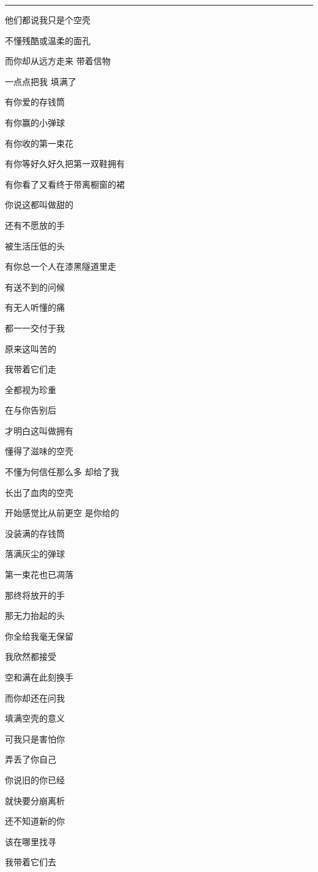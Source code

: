\documentclass[]{ctexbook}
\begin{document}
\begin{center}\rule{0.5\linewidth}{0.5pt}\end{center}

他们都说我只是个空壳

不懂残酷或温柔的面孔

而你却从远方走来 带着信物

一点点把我 填满了

有你爱的存钱筒

有你赢的小弹球

有你收的第一束花

有你等好久好久把第一双鞋拥有

有你看了又看终于带离橱窗的裙

你说这都叫做甜的

还有不愿放的手

被生活压低的头

有你总一个人在漆黑隧道里走

有送不到的问候

有无人听懂的痛

都一一交付于我

原来这叫苦的

我带着它们走

全都视为珍重

在与你告别后

才明白这叫做拥有

懂得了滋味的空壳

不懂为何信任那么多 却给了我

长出了血肉的空壳

开始感觉比从前更空 是你给的

没装满的存钱筒

落满灰尘的弹球

第一束花也已凋落

那终将放开的手

那无力抬起的头

你全给我毫无保留

我欣然都接受

空和满在此刻换手

而你却还在问我

填满空壳的意义

可我只是害怕你

弄丢了你自己

你说旧的你已经

就快要分崩离析

还不知道新的你

该在哪里找寻

我带着它们去
\end{document}
